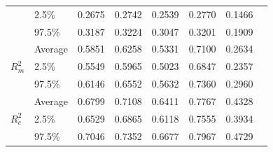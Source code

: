 \begin{table}[!ht]
\begin{tabular}{@{}llcccccc@{}}
                                           & 2.5\%   & 0.2675 & 0.2742 & 0.2539 & 0.2770 & 0.1466 \\
                                           & 97.5\%  & 0.3187 & 0.3224 & 0.3047 & 0.3201 & 0.1909 \\ \midrule
      \multirow{3}{*}{$R^2_m$}            & Average & 0.5851 & 0.6258 & 0.5331 & 0.7100 & 0.2634 \\
                                           & 2.5\%   & 0.5549 & 0.5965 & 0.5023 & 0.6847 & 0.2357 \\
                                           & 97.5\%  & 0.6146 & 0.6552 & 0.5632 & 0.7360 & 0.2960 \\ \midrule
      \multirow{3}{*}{$R^2_c$}            & Average & 0.6799 & 0.7108 & 0.6411 & 0.7767 & 0.4328 \\
                                           & 2.5\%   & 0.6529 & 0.6865 & 0.6118 & 0.7555 & 0.3934 \\
                                           & 97.5\%  & 0.7046 & 0.7352 & 0.6677 & 0.7967 & 0.4729 \\ \bottomrule
    \end{tabular}

\end{table}
